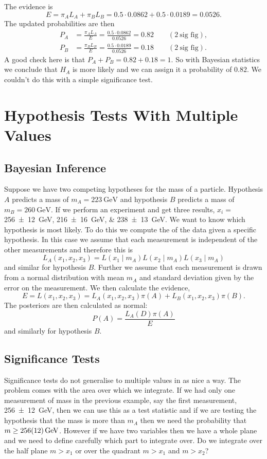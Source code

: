 \documentclass[a4paper]{article}
\newcommand{\st}{\mid}
\begin{document}
\begin{example}
        The evidence is
        \[E = \pi_AL_A + \pi_BL_B = 0.5\cdot0.0862 + 0.5\cdot0.0189 = 0.0526.\]
        The updated probabilities are then
        \begin{align*}
            P_A &= \frac{\pi_AL_A}{E} = \frac{0.5\cdot0.0862}{0.0526} = 0.82\qquad(2~\text{sig fig}),\\
            P_B &= \frac{\pi_BL_B}{E} = \frac{0.5\cdot0.0189}{0.0526} = 0.18\qquad(2~\text{sig fig}).
        \end{align*}
        A good check here is that \(P_A + P_B = 0.82 + 0.18 = 1\).
        So with Bayesian statistics we conclude that \(H_A\) is more likely and we can assign it a probability of \(0.82\).
        We couldn't do this with a simple significance test.
    \end{example}

    \section{Hypothesis Tests With Multiple Values}
    \subsection{Bayesian Inference}
    Suppose we have two competing hypotheses for the mass of a particle.
    Hypothesis \(A\) predicts a mass of \(m_A = \SI{223}{\giga\electronvolt}\) and hypothesis \(B\) predicts a mass of \(m_B = \SI{260}{\giga\electronvolt}\).
    If we perform an experiment and get three results, \(x_i = \)\SIlist{256+- 12; 216+- 16; 238+- 13}{\giga\electronvolt}.
    We want to know which hypothesis is most likely.
    To do this we compute the  of the data given a specific hypothesis.
    In this case we assume that each measurement is independent of the other measurements and therefore this is
    \[L_A(x_1, x_2, x_3) = L(x_1\st m_A)L(x_2\st m_A)L(x_3\st m_A)\]
    and similar for hypothesis \(B\).
    Further we assume that each measurement is drawn from a normal distribution with mean \(m_A\) and standard deviation given by the error on the measurement.
    We then calculate the evidence,
    \[E = L(x_1, x_2, x_3) = L_A(x_1, x_2, x_3)\pi(A) + L_B(x_1, x_2, x_3)\pi(B).\]
    The posteriors are then calculated as normal:
    \[P(A) = \frac{L_A(D)\pi(A)}{E}\]
    and similarly for hypothesis \(B\).
    
    \subsection{Significance Tests}
    Significance tests do not generalise to multiple values in as nice a way.
    The problem comes with the area over which we integrate.
    If we had only one measurement of mass in the previous example, say the first measurement, \SI{256+-12}{\giga\electronvolt}, then we can use this as a test statistic and if we are testing the hypothesis that the mass is more than \(m_A\) then we need the probability that \(m \ge \SI{256+-12}{\giga\electronvolt}\).
    However if we have two variables then we have a whole plane and we need to define carefully which part to integrate over.
    Do we integrate over the half plane \(m > x_1\) or over the quadrant \(m > x_1\) and \(m > x_2\)?
    
\end{document}
